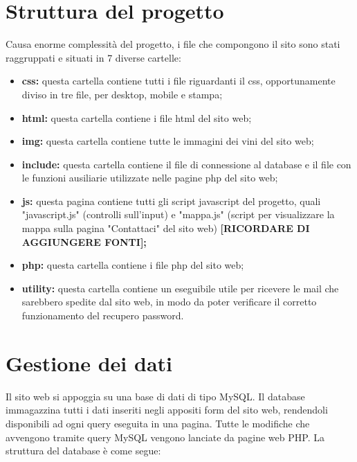 \section{Struttura del progetto}

Causa enorme complessità del progetto, i file che compongono il sito sono stati
raggruppati e situati in 7 diverse cartelle:

\begin{itemize}
	\item \textbf{css:} questa cartella contiene tutti i file riguardanti il css, opportunamente diviso in tre file, per desktop, mobile e stampa;
	\item \textbf{html:} questa cartella contiene i file html del sito web;
	\item \textbf{img:} questa cartella contiene tutte le immagini dei vini del sito web;
	\item \textbf{include:} questa cartella contiene il file di connessione al database e il file con le funzioni ausiliarie utilizzate nelle pagine php del sito web;
	\item \textbf{js:} questa pagina contiene tutti gli script javascript del progetto, quali "javascript.js" (controlli sull'input) e 
	"mappa.js" (script per visualizzare la mappa sulla pagina "Contattaci" del sito web) \textbf{[RICORDARE DI AGGIUNGERE FONTI];}
	\item \textbf{php:} questa cartella contiene i file php del sito web;
	\item \textbf{utility:} questa cartella contiene un eseguibile utile per ricevere le mail che sarebbero spedite dal sito web, in modo da poter verificare il corretto funzionamento del recupero password.
\end{itemize}

\section{Gestione dei dati}

Il sito web si appoggia su una base di dati di tipo MySQL. Il database immagazzina tutti i dati inseriti negli appositi form del sito web, rendendoli disponibili ad ogni query eseguita in una pagina. Tutte le modifiche che avvengono tramite query MySQL vengono lanciate da pagine web PHP. La struttura del database è come segue:

